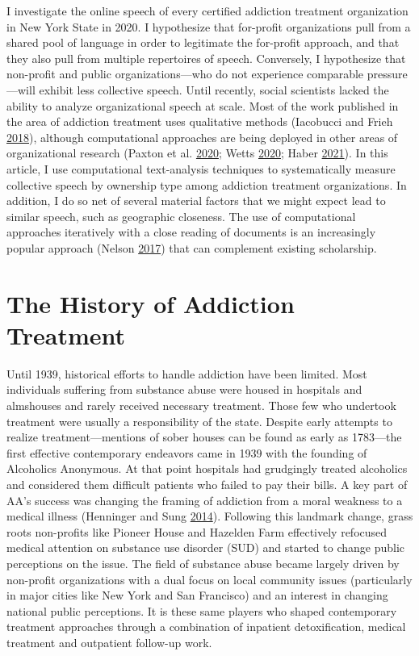 \documentclass[
  12pt,
]{article}
\begin{document}
\vspace{12pt}

I investigate the online speech of every certified addiction treatment organization in New York State in 2020. I hypothesize that for-profit organizations pull from a shared pool of language in order to legitimate the for-profit approach, and that they also pull from multiple repertoires of speech. Conversely, I hypothesize that non-profit and public organizations---who do not experience comparable pressure---will exhibit less collective speech. Until recently, social scientists lacked the ability to analyze organizational speech at scale. Most of the work published in the area of addiction treatment uses qualitative methods (Iacobucci and Frieh \protect\hyperlink{ref-iacobucci2018}{2018}), although computational approaches are being deployed in other areas of organizational research (Paxton et al. \protect\hyperlink{ref-paxton2020}{2020}; Wetts \protect\hyperlink{ref-wetts2020}{2020}; Haber \protect\hyperlink{ref-haber2021}{2021}). In this article, I use computational text-analysis techniques to systematically measure collective speech by ownership type among addiction treatment organizations. In addition, I do so net of several material factors that we might expect lead to similar speech, such as geographic closeness. The use of computational approaches iteratively with a close reading of documents is an increasingly popular approach (Nelson \protect\hyperlink{ref-nelson2017}{2017}) that can complement existing scholarship.

\hypertarget{the-history-of-addiction-treatment}{%
\section{The History of Addiction Treatment}\label{the-history-of-addiction-treatment}}

Until 1939, historical efforts to handle addiction have been limited. Most individuals suffering from substance abuse were housed in hospitals and almshouses and rarely received necessary treatment. Those few who undertook treatment were usually a responsibility of the state. Despite early attempts to realize treatment---mentions of sober houses can be found as early as 1783---the first effective contemporary endeavors came in 1939 with the founding of Alcoholics Anonymous. At that point hospitals had grudgingly treated alcoholics and considered them difficult patients who failed to pay their bills. A key part of AA's success was changing the framing of addiction from a moral weakness to a medical illness (Henninger and Sung \protect\hyperlink{ref-henninger2014}{2014}). Following this landmark change, grass roots non-profits like Pioneer House and Hazelden Farm effectively refocused medical attention on substance use disorder (SUD) and started to change public perceptions on the issue. The field of substance abuse became largely driven by non-profit organizations with a dual focus on local community issues (particularly in major cities like New York and San Francisco) and an interest in changing national public perceptions. It is these same players who shaped contemporary treatment approaches through a combination of inpatient detoxification, medical treatment and outpatient follow-up work.
\end{document}
